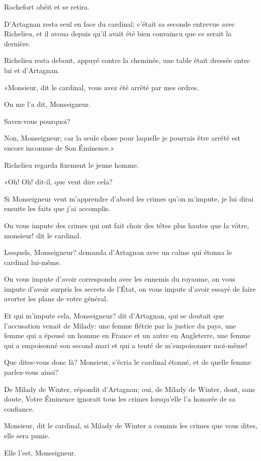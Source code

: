 Rochefort obéit et se retira. 

D'Artagnan resta seul en face du cardinal; c'était sa seconde entrevue avec Richelieu, et il avoua depuis qu'il avait été bien convaincu que ce serait la dernière. 

Richelieu resta debout, appuyé contre la cheminée, une table était dressée entre lui et d'Artagnan. 

«Monsieur, dit le cardinal, vous avez été arrêté par mes ordres. 

\speak  On me l'a dit, Monseigneur. 

\speak  Savez-vous pourquoi? 

\speak  Non, Monseigneur; car la seule chose pour laquelle je pourrais être arrêté est encore inconnue de Son Éminence.» 

Richelieu regarda fixement le jeune homme. 

«Oh! Oh! dit-il, que veut dire cela? 

\speak  Si Monseigneur veut m'apprendre d'abord les crimes qu'on m'impute, je lui dirai ensuite les faits que j'ai accomplis. 

\speak  On vous impute des crimes qui ont fait choir des têtes plus hautes que la vôtre, monsieur! dit le cardinal. 

\speak  Lesquels, Monseigneur? demanda d'Artagnan avec un calme qui étonna le cardinal lui-même. 

\speak  On vous impute d'avoir correspondu avec les ennemis du royaume, on vous impute d'avoir surpris les secrets de l'État, on vous impute d'avoir essayé de faire avorter les plans de votre général. 

\speak  Et qui m'impute cela, Monseigneur? dit d'Artagnan, qui se doutait que l'accusation venait de Milady: une femme flétrie par la justice du pays, une femme qui a épousé un homme en France et un autre en Angleterre, une femme qui a empoisonné son second mari et qui a tenté de m'empoisonner moi-même! 

\speak  Que dites-vous donc là? Monsieur, s'écria le cardinal étonné, et de quelle femme parlez-vous ainsi? 

\speak  De Milady de Winter, répondit d'Artagnan; oui, de Milady de Winter, dont, sans doute, Votre Éminence ignorait tous les crimes lorsqu'elle l'a honorée de sa confiance. 

\speak  Monsieur, dit le cardinal, si Milady de Winter a commis les crimes que vous dites, elle sera punie. 

\speak  Elle l'est, Monseigneur. 

